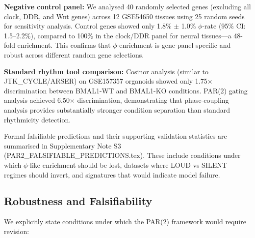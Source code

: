 \documentclass[11pt,a4paper]{article}
\begin{document}
\textbf{Negative control panel:} We analysed 40 randomly selected genes (excluding all clock, DDR, and Wnt genes) across 12 GSE54650 tissues using 25 random seeds for sensitivity analysis. Control genes showed only 1.8\% $\pm$ 1.0\% $\phi$-rate (95\% CI: 1.5--2.2\%), compared to 100\% in the clock/DDR panel for neural tissues---a 48-fold enrichment. This confirms that $\phi$-enrichment is gene-panel specific and robust across different random gene selections.

\textbf{Standard rhythm tool comparison:} Cosinor analysis (similar to JTK\_CYCLE/ARSER) on GSE157357 organoids showed only 1.75$\times$ discrimination between BMAL1-WT and BMAL1-KO conditions. PAR(2) gating analysis achieved 6.50$\times$ discrimination, demonstrating that phase-coupling analysis provides substantially stronger condition separation than standard rhythmicity detection.

Formal falsifiable predictions and their supporting validation statistics are summarised in Supplementary Note S3 (PAR2\_FALSIFIABLE\_PREDICTIONS.tex). These include conditions under which $\phi$-like enrichment should be lost, datasets where LOUD vs SILENT regimes should invert, and signatures that would indicate model failure.

\subsection{Robustness and Falsifiability}

We explicitly state conditions under which the PAR(2) framework would require revision:
\end{document}

